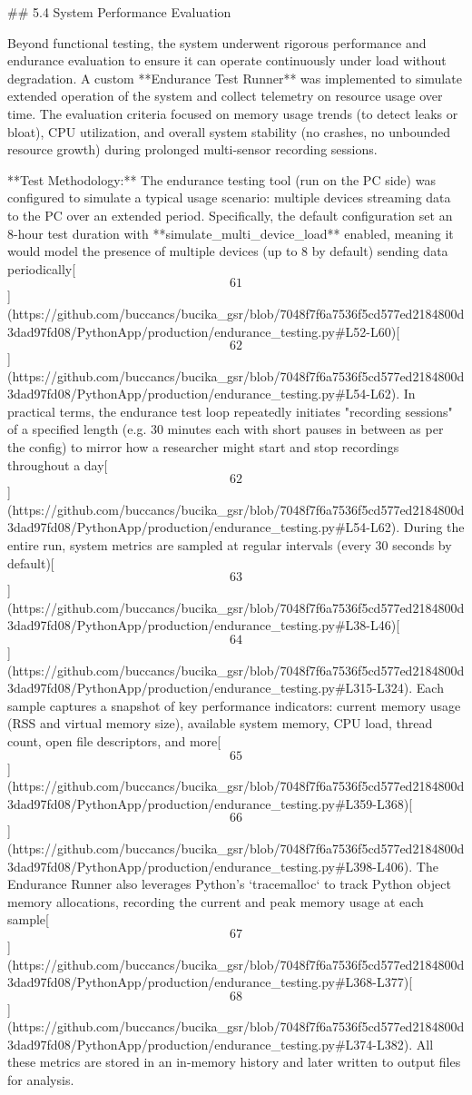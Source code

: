 \documentclass[12pt,a4paper]{article}
\begin{document}
{## 5.4 System Performance Evaluation

Beyond functional testing, the system underwent rigorous performance and
endurance evaluation to ensure it can operate continuously under load
without degradation. A custom **Endurance Test Runner** was implemented
to simulate extended operation of the system and collect telemetry on
resource usage over time. The evaluation criteria focused on memory
usage trends (to detect leaks or bloat), CPU utilization, and overall
system stability (no crashes, no unbounded resource growth) during
prolonged multi-sensor recording sessions.

**Test Methodology:** The endurance testing tool (run on the PC side)
was configured to simulate a typical usage scenario: multiple devices
streaming data to the PC over an extended period. Specifically, the
default configuration set an 8-hour test duration with
**simulate_multi_device_load** enabled, meaning it would model the
presence of multiple devices (up to 8 by default) sending data
periodically[\[61\]](https://github.com/buccancs/bucika_gsr/blob/7048f7f6a7536f5cd577ed2184800d3dad97fd08/PythonApp/production/endurance_testing.py#L52-L60)[\[62\]](https://github.com/buccancs/bucika_gsr/blob/7048f7f6a7536f5cd577ed2184800d3dad97fd08/PythonApp/production/endurance_testing.py#L54-L62).
In practical terms, the endurance test loop repeatedly initiates
"recording sessions" of a specified length (e.g. 30 minutes each with
short pauses in between as per the config) to mirror how a researcher
might start and stop recordings throughout a
day[\[62\]](https://github.com/buccancs/bucika_gsr/blob/7048f7f6a7536f5cd577ed2184800d3dad97fd08/PythonApp/production/endurance_testing.py#L54-L62).
During the entire run, system metrics are sampled at regular intervals
(every 30 seconds by
default)[\[63\]](https://github.com/buccancs/bucika_gsr/blob/7048f7f6a7536f5cd577ed2184800d3dad97fd08/PythonApp/production/endurance_testing.py#L38-L46)[\[64\]](https://github.com/buccancs/bucika_gsr/blob/7048f7f6a7536f5cd577ed2184800d3dad97fd08/PythonApp/production/endurance_testing.py#L315-L324).
Each sample captures a snapshot of key performance indicators: current
memory usage (RSS and virtual memory size), available system memory, CPU
load, thread count, open file descriptors, and
more[\[65\]](https://github.com/buccancs/bucika_gsr/blob/7048f7f6a7536f5cd577ed2184800d3dad97fd08/PythonApp/production/endurance_testing.py#L359-L368)[\[66\]](https://github.com/buccancs/bucika_gsr/blob/7048f7f6a7536f5cd577ed2184800d3dad97fd08/PythonApp/production/endurance_testing.py#L398-L406).
The Endurance Runner also leverages Python's `tracemalloc` to track
Python object memory allocations, recording the current and peak memory
usage at each
sample[\[67\]](https://github.com/buccancs/bucika_gsr/blob/7048f7f6a7536f5cd577ed2184800d3dad97fd08/PythonApp/production/endurance_testing.py#L368-L377)[\[68\]](https://github.com/buccancs/bucika_gsr/blob/7048f7f6a7536f5cd577ed2184800d3dad97fd08/PythonApp/production/endurance_testing.py#L374-L382).
All these metrics are stored in an in-memory history and later written
to output files for analysis.

}
\end{document}

